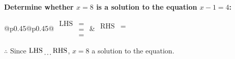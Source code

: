 \documentclass[12pt, varwidth, border=5mm]{standalone}
\begin{document}
    \noindent \textbf{Determine whether \(x = 8\) is a solution to the equation \(x - 1 = 4\):}
\vspace{2pt}  %

\noindent
\renewcommand{\arraystretch}{1.3} %
\begin{tabular}{@{}p{0.45\linewidth}@{}p{0.45\linewidth}@{}}
    \(\begin{aligned}
        \text{LHS} &=  \\
                   &=  \\
                   &=
    \end{aligned}\) &
    \(\begin{aligned}
        \text{RHS} &= \\
                   & \\
                   &
    \end{aligned}\)
\end{tabular}
\renewcommand{\arraystretch}{1.0} %
\vspace{2pt}  %

\noindent \(\therefore\) Since \(\text{LHS} \dotuline{\hspace{5mm}} \text{RHS}\), \(x = 8\) \dotuline{\hspace{12mm}} a solution to the equation.
\end{document}
